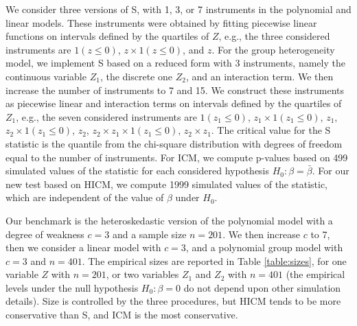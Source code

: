 \documentclass[12pt]{article}
\newcommand{\1}{\mathbf{1}}
\begin{document}
We consider three versions of S, with 1, 3, or 7 instruments
in the polynomial and linear models. These instruments were obtained by
fitting piecewise linear functions on intervals defined by the
quartiles of $Z$, e.g., the three considered instruments are
$1(z\leq 0)$, $z \times 1(z\leq0)$, and $z$. For the group
heterogeneity model,  we implement S based on a reduced form with 3
instruments, namely the continuous variable $Z_1$, the discrete one
$Z_2$, and an interaction term. We then increase the number
of instruments to 7 and 15. We construct these instruments as
piecewise linear and interaction terms on intervals defined by the
quartiles of $Z_1$, e.g., the seven considered instruments are
$1(z_1\leq0)$, $z_1 \times 1(z_1 \leq 0)$, $z_1$, $z_2 \times 1(z_1
\leq 0)$, $z_2$, $z_2\times z_1 \times 1(z_1\leq 0)$, $z_2\times
z_1$. The critical value for the S statistic is  the quantile
from the  chi-square distribution with degrees of freedom equal to the
number of instruments.
For ICM, we compute p-values based on
499 simulated values of the statistic for each
considered hypothesis $H_0:\beta=\bar\beta$. For our new
test based on HICM, we compute 1999 simulated values of the
statistic, which are independent of the value of $\beta$ under $H_0$.


Our benchmark is the heteroskedastic version of the polynomial model
with a degree of weakness $c = 3$ and a sample size $n = 201$. We then
increase $c$ to 7, then we consider a linear model with $c=3$, and a
polynomial group model with $c=3$ and $n=401$.  The empirical sizes
are reported in Table \ref{table:sizes}, for one variable $Z$ with
$n=201$, or two variables $Z_1$ and $Z_2$ with $n=401$ (the
empirical levels under the null hypothesis $H_0: \beta = 0$ do not
depend upon other simulation details).  Size is controlled by the
three procedures, but HICM tends to be more conservative than
S, and ICM is the most conservative.

\begin{table}[!ht]
\centering
{}
\caption{\small Empirical sizes for HICM, ICM, and S, at  nominal  level of 5\% or 10\%.}
\label{table:sizes}
\end{table}
\end{document}
